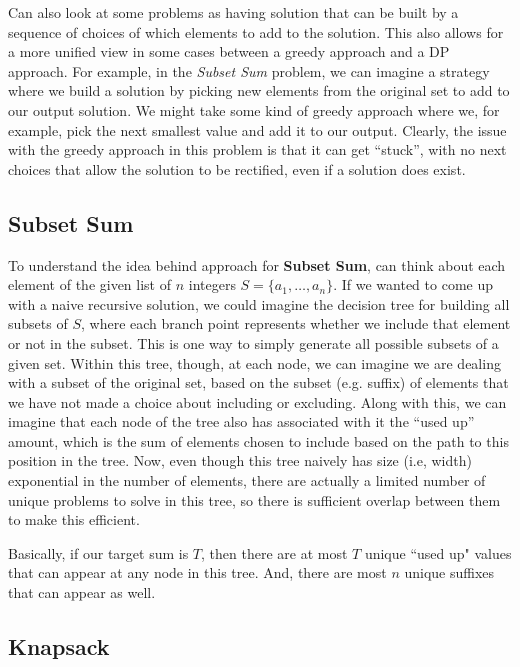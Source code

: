 \documentclass[10pt,a4paper]{article}
\begin{document}
Can also look at some problems as having solution that can be built by a sequence of choices of which elements to add to the solution. This also allows for a more unified view in some cases between a greedy approach and a DP approach. For example, in the \textit{Subset Sum} problem, we can imagine a strategy where we build a solution by picking new elements from the original set to add to our output solution. We might take some kind of greedy approach where we, for example, pick the next smallest value and add it to our output. Clearly, the issue with the greedy approach in this problem is that it can get ``stuck'', with no next choices that allow the solution to be rectified, even if a solution does exist.


\subsection*{Subset Sum}
\label{sec:subset-sum}

To understand the idea behind approach for \textbf{Subset Sum}, can think about each element of the given list of $n$ integers $S=\{a_1,\dots,a_n\}$. If we wanted to come up with a naive recursive solution, we could imagine the decision tree for building all subsets of $S$, where each branch point represents whether we include that element or not in the subset. This is one way to simply generate all possible subsets of a given set. Within this tree, though, at each node, we can imagine we are dealing with a subset of the original set, based on the subset (e.g. suffix) of elements that we have not made a choice about including or excluding. Along with this, we can imagine that each node of the tree also has associated with it the ``used up'' amount, which is the sum of elements chosen to include based on the path to this position in the tree. Now, even though this tree naively has size (i.e, width) exponential in the number of elements, there are actually a limited number of unique problems to solve in this tree, so there is sufficient overlap between them to make this efficient.

Basically, if our target sum is $T$, then there are at most $T$ unique ``used up" values that can appear at any node in this tree. And, there are most $n$ unique suffixes that can appear as well.


\subsection*{Knapsack}
\end{document}
